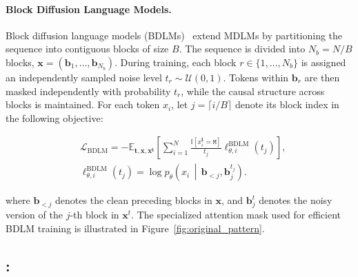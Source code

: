 \paragraph{Block Diffusion Language Models.}
Block diffusion language models (BDLMs)~\citep{bd3lms} extend MDLMs by
partitioning the sequence into contiguous blocks of size $B$.
The sequence is divided into $N_b=N/B$ blocks,
$\mathbf{x}=(\mathbf{b}_1,\ldots,\mathbf{b}_{N_b})$.
During training, each block $r\in\{1,\ldots,N_b\}$ is assigned an
independently sampled noise level $t_r\sim\mathcal{U}(0,1)$.
Tokens within $\mathbf{b}_r$ are then masked independently with probability
$t_r$, while the causal structure across blocks is maintained.
For each token $x_i$, let
$j=\lceil i/B\rceil$
denote its block index in the following objective:

\begin{equation}
\begin{aligned}
&\mathcal{L}_{\mathrm{BDLM}}
=
-\mathbb{E}_{\boldsymbol{t},\mathbf{x},\mathbf{x}^{\boldsymbol{t}}}
\left[
\sum_{i=1}^{N}
\frac{
\mathbb{I}\!\left[x_i^{\boldsymbol{t}}=\mathtt{M}\right]
}{
t_j
}
\ell_{\theta,i}^{\mathrm{BDLM}}(t_j)
\right], \\
&
\ell_{\theta,i}^{\mathrm{BDLM}}(t_j)
=
\log p_{\theta}
\left(
x_i
\,\middle|\,
\mathbf{b}_{<j},
\mathbf{b}_{j}^{t_j}
\right).
\end{aligned}
\label{eq:bdlm_loss}
\end{equation}

where $\mathbf{b}_{<j}$ denotes the clean preceding blocks in $\mathbf{x}$, and $\mathbf{b}_{j}^{t}$ denotes the noisy version of the $j$-th block in $\mathbf{x}^{t}$. The specialized attention mask used for efficient BDLM training is illustrated in Figure~\ref{fig:original_pattern}.

\subsection{\name{}: \NAME{}}


